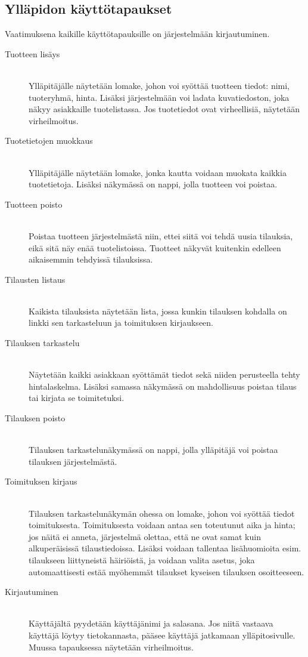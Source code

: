 \documentclass[a4paper, 12pt, finnish]{article}
\begin{document}
\subsection*{Ylläpidon käyttötapaukset}
Vaatimuksena kaikille käyttötapauksille on järjestelmään kirjautuminen.
\begin{description}
\item[Tuotteen lisäys]\mbox{}\\
Ylläpitäjälle näytetään lomake, johon voi syöttää tuotteen tiedot: nimi, tuoteryhmä, hinta. Lisäksi järjestelmään voi ladata kuvatiedoston, joka näkyy asiakkaille tuotelistassa. Jos tuotetiedot ovat virheellisiä, näytetään virheilmoitus.
\item[Tuotetietojen muokkaus]\mbox{}\\
Ylläpitäjälle näytetään lomake, jonka kautta voidaan muokata kaikkia tuotetietoja. Lisäksi näkymässä on nappi, jolla tuotteen voi poistaa.
\item[Tuotteen poisto]\mbox{}\\
Poistaa tuotteen järjestelmästä niin, ettei siitä voi tehdä uusia tilauksia, eikä sitä näy enää tuotelistoissa. Tuotteet näkyvät kuitenkin edelleen aikaisemmin tehdyissä tilauksissa.
\item[Tilausten listaus]\mbox{}\\
Kaikista tilauksista näytetään lista, jossa kunkin tilauksen kohdalla on linkki sen tarkasteluun ja toimituksen kirjaukseen.
\item[Tilauksen tarkastelu]\mbox{}\\
Näytetään kaikki asiakkaan syöttämät tiedot sekä niiden perusteella tehty hintalaskelma. Lisäksi samassa näkymässä on mahdollisuus poistaa tilaus tai kirjata se toimitetuksi.
\item[Tilauksen poisto]\mbox{}\\
Tilauksen tarkastelunäkymässä on nappi, jolla ylläpitäjä voi poistaa tilauksen järjestelmästä.
\item[Toimituksen kirjaus]\mbox{}\\
Tilauksen tarkastelunäkymän ohessa on lomake, johon voi syöttää tiedot toimituksesta. Toimituksesta voidaan antaa sen toteutunut aika ja hinta; jos näitä ei anneta, järjestelmä olettaa, että ne ovat samat kuin alkuperäisissä tilaustiedoissa. Lisäksi voidaan tallentaa lisähuomioita esim. tilaukseen liittyneistä häiriöistä, ja voidaan valita asetus, joka automaattisesti estää myöhemmät tilaukset kyseisen tilauksen osoitteeseen.
\item[Kirjautuminen]\mbox{}\\
Käyttäjältä pyydetään käyttäjänimi ja salasana. Jos niitä vastaava käyttäjä löytyy tietokannasta, pääsee käyttäjä jatkamaan ylläpitosivulle. Muussa tapauksessa näytetään virheilmoitus.

\end{description}
\end{document}
